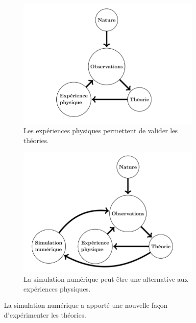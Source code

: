     
    \begin{figure}[t!]
        \centering
        \begin{subfigure}[t]{0.48\textwidth}
            \centering
            \includegraphics[width=\linewidth]{images/edl_simu_old.png}
            \caption{\label{fig:edl_simu_old}Les expériences physiques permettent de valider les théories.}
        \end{subfigure}\hfill
        \begin{subfigure}[t]{0.48\textwidth}
            \centering
            \includegraphics[width=\linewidth]{images/edl_simu_new.png}
            \caption{\label{fig:edl_simu_new}La simulation numérique peut être une alternative aux expériences physiques.}
        \end{subfigure}
        \caption{La simulation numérique a apporté une nouvelle façon d'expérimenter les théories.}
        \label{fig:tikz_simulation}
    \end{figure}
    

